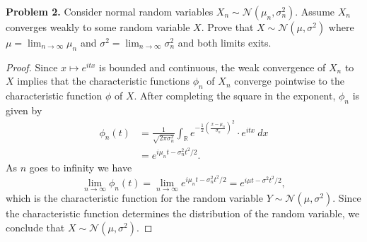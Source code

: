 \documentclass[11pt,letterpaper]{report}
\newcommand{\reals}{\mathbb{R}}
\newcommand{\mcal}[1]{\mathcal{#1}}
\begin{document}
\noindent\textbf{Problem 2. }
Consider normal random variables $X_n\sim \mcal{N}(\mu_n, \sigma^2_n)$. Assume $X_n$ converges weakly to some random variable $X$. Prove that $X\sim \mcal{N}(\mu, \sigma^2)$ where $\mu = \lim_{n\to \infty}\mu_n$ and $\sigma^2 = \lim_{n\to \infty}\sigma_n^2$ and both limits exits.
\begin{proof}
	Since $x\mapsto e^{itx}$ is bounded and continuous, the weak convergence of $X_n$ to $X$ implies that the characteristic functions $\phi_n$ of $X_n$ converge pointwise to the characteristic function $\phi$ of $X$. After completing the square in the exponent, $\phi_n$ is given by
	\begin{align*}
		\phi_n(t) &= \frac{1}{\sqrt{2\pi \sigma_n^2}}\int_\reals e^{-\frac{1}{2}\left(\frac{x-\mu_n}{\sigma_n}\right)^2}\cdot e^{itx}\ dx\\
		&= e^{i\mu_nt - \sigma_n^2t^2/2}.
	\end{align*}
	As $n$ goes to infinity we have
	\[
	\lim_{n\to \infty}\phi_n(t) = \lim_{n\to \infty}e^{i\mu_nt - \sigma_n^2t^2/2} = e^{i\mu t- \sigma^2t^2/2},
	\]
	which is the characteristic function for the random variable $Y\sim \mcal{N}(\mu, \sigma^2)$. Since the characteristic function determines the distribution of the random variable, we conclude that $X\sim \mcal{N}(\mu, \sigma^2)$.
\end{proof}
\end{document}
